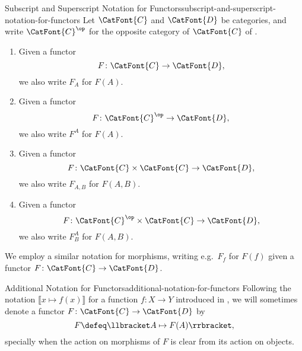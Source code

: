 \begin{notation}{Subscript and Superscript Notation for Functors}{subscript-and-superscript-notation-for-functors}%
    Let $\CatFont{C}$ and $\CatFont{D}$ be categories, and write $\CatFont{C}^{\op}$ for the opposite category of $\CatFont{C}$ of .
    \begin{enumerate}
        \item\label{subscript-and-superscript-notation-for-functors-1}Given a functor
            \[
                F%
                \colon%
                \CatFont{C}%
                \to%
                \CatFont{D},%
            \]%
            we also write $F_{A}$ for $F(A)$.
        \item\label{subscript-and-superscript-notation-for-functors-2}Given a functor
            \[
                F%
                \colon%
                \CatFont{C}^{\op}%
                \to%
                \CatFont{D},%
            \]%
            we also write $F^{A}$ for $F(A)$.
        \item\label{subscript-and-superscript-notation-for-functors-3}Given a functor
            \[
                F%
                \colon%
                \CatFont{C}\times\CatFont{C}%
                \to%
                \CatFont{D},%
            \]%
            we also write $F_{A,B}$ for $F(A,B)$.
        \item\label{subscript-and-superscript-notation-for-functors-4}Given a functor
            \[
                F%
                \colon%
                \CatFont{C}^{\op}\times\CatFont{C}%
                \to%
                \CatFont{D},%
            \]%
            we also write $F^{A}_{B}$ for $F(A,B)$.
    \end{enumerate}
    We employ a similar notation for morphisms, writing e.g.\ $F_{f}$ for $F(f)$ given a functor $F\colon\CatFont{C}\to\CatFont{D}$.
\end{notation}
\begin{notation}{Additional Notation for Functors}{additional-notation-for-functors}%
    Following the notation $\llbracket x\mapsto f(x)\rrbracket$ for a function $f\colon X\to Y$ introduced in , we will sometimes denote a functor $F\colon\CatFont{C}\to\CatFont{D}$ by
    \[
        F%
        \defeq%
        \llbracket A\mapsto F(A)\rrbracket,%
    \]%
    specially when the action on morphisms of $F$ is clear from its action on objects.
\end{notation}
